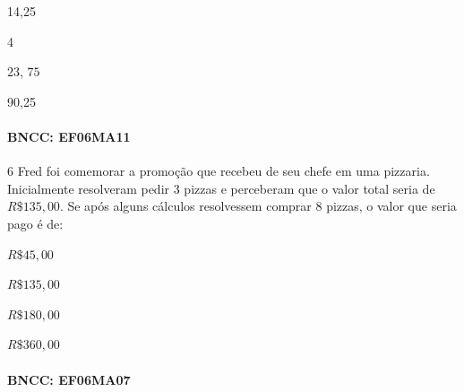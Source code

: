 \begin{escolha}
\item14,25
\item4
\item $23$, $75$
\item90,25
\end{escolha}

\paragraph{BNCC: EF06MA11 }


\num{6}  Fred foi comemorar a promoção que recebeu de seu chefe em uma
pizzaria. Inicialmente resolveram pedir $3$ pizzas e perceberam que o
valor total seria de $R\$135,00$. Se após alguns cálculos resolvessem
comprar $8$ pizzas, o valor que seria pago é de:

\begin{escolha}
\item $R\$45,00$
\item $R\$135,00$
\item $R\$180,00$
\item $R\$360,00$
\end{escolha}

\paragraph{BNCC: EF06MA07 }


